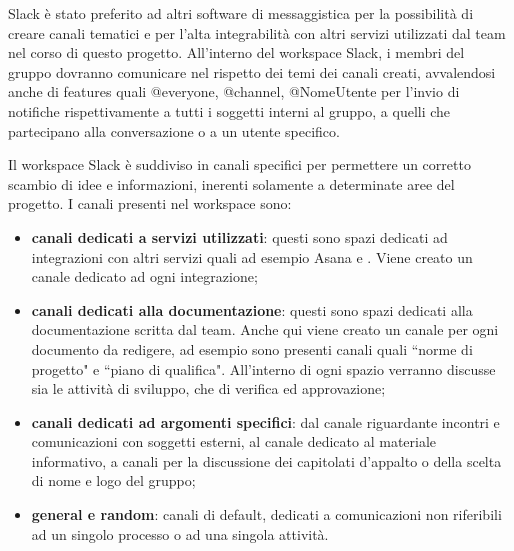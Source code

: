                 Slack è stato preferito ad altri software di messaggistica per la possibilità di creare 
                canali tematici e per l'alta integrabilità con altri servizi utilizzati dal team nel 
                corso di questo progetto.
                All'interno del workspace Slack, i membri del gruppo dovranno comunicare nel rispetto dei 
                temi dei canali creati, avvalendosi anche di features quali @everyone, @channel, 
                @NomeUtente per l'invio di notifiche rispettivamente a tutti i soggetti interni al 
                gruppo, a quelli che partecipano alla conversazione o a un utente specifico.

                Il workspace Slack è suddiviso in canali specifici per permettere un corretto scambio di 
                idee e informazioni, inerenti solamente a determinate aree del progetto.
                I canali presenti nel workspace sono:

                    \begin{itemize}
                        \item \textbf{canali dedicati a servizi utilizzati}: questi sono spazi dedicati ad integrazioni
                        con altri servizi quali ad esempio Asana e . Viene creato un canale dedicato ad ogni integrazione;
                        \item \textbf{canali dedicati alla documentazione}: questi sono spazi dedicati alla documentazione
                        scritta dal team. Anche qui viene creato un canale per ogni documento da redigere, ad esempio
                        sono presenti canali quali ``norme di progetto" e ``piano di qualifica". All'interno di ogni spazio
                        verranno discusse sia le attività di sviluppo, che di verifica ed approvazione;
                        \item \textbf{canali dedicati ad argomenti specifici}: dal canale riguardante incontri e comunicazioni
                        con soggetti esterni, al canale dedicato al materiale informativo, a canali per la discussione dei
                        capitolati d'appalto o della scelta di nome e logo del gruppo;
                        \item \textbf{general e random}: canali di default, dedicati a comunicazioni non riferibili ad un
                        singolo processo o ad una singola attività.
                    \end{itemize}

